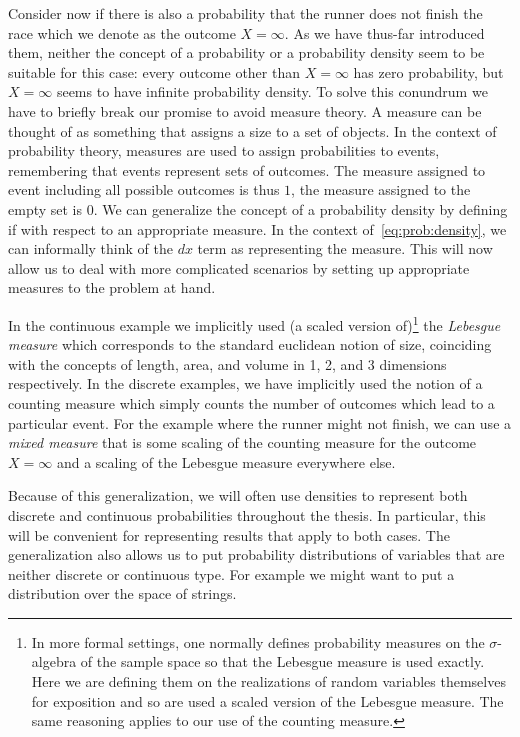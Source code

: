 Consider now if there is also a probability that the runner does not finish the race which
we denote as the outcome $X=\infty$.  As we
have thus-far introduced them, neither the concept of a probability or a probability density
seem to be suitable for this case: every outcome other than $X=\infty$ has zero probability,
but $X=\infty$ seems to have infinite probability density.  To solve this conundrum we 
have to briefly break our promise to avoid measure theory.  A measure can be thought of
as something that assigns a size to a set of objects.  In the context of probability theory,
measures are used to assign probabilities to events, remembering that events represent 
sets of outcomes.  The measure assigned to event including all possible outcomes is thus $1$,
the measure assigned to the empty set is $0$.  We can generalize the concept of a probability 
density by defining if with respect to an appropriate measure.  In the context of~\eqref{eq:prob:density}, we can informally think of the $dx$ term as representing the measure.
This will now allow us to
deal with more complicated scenarios by setting up appropriate measures to the problem at hand.

In the continuous example
we implicitly used (a scaled version of)\footnote{In more formal settings, one normally defines
	 probability measures on the $\sigma$-algebra of the sample space so that the 
	 Lebesgue measure is used exactly.  Here we are defining them on the 
	 realizations of random variables themselves for exposition and so are used a scaled version
	 of the Lebesgue measure.  The same reasoning applies to our use of the counting measure.}
the \emph{Lebesgue measure} which corresponds to
the standard euclidean notion of size, coinciding with the concepts of length, area, and
volume in 1, 2, and 3 dimensions respectively.  In the discrete examples, we have implicitly
used the notion of a counting measure which simply counts the number of outcomes which
lead to a particular event.   For the example where the runner might not finish, we can
use a \emph{mixed measure} that is some scaling of the counting measure for the outcome
$X=\infty$ and a scaling of the Lebesgue measure everywhere else.  

Because of this generalization, we will often use densities to represent both discrete
and continuous probabilities throughout the thesis.  In particular, this will be convenient
for representing results that apply to both cases.  The generalization also allows us
to put probability distributions of variables that are neither discrete or continuous type.
For example we might want to put a distribution over the space of strings. 

